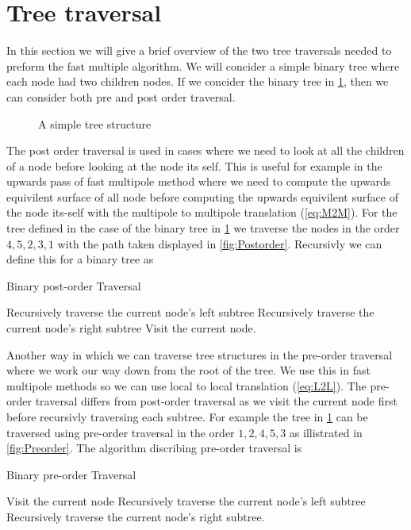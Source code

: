 \FloatBarrier
\section{Tree traversal}\label{appendix:Tree}
In this section we will give a brief overview of the two tree traversals needed to preform the fast multiple algorithm. We will concider a simple binary tree where each node had two children nodes. If we concider the binary tree in \cref{fig:BlankTree}, then we can consider both pre and post order traversal.
\begin{figure}[ht]
    \centering
    \resizebox{.4\linewidth}{!}{}
    \caption{A simple tree structure}
    \label{fig:BlankTree}
\end{figure}
The post order traversal is used in cases where we need to look at all the children of a node before looking at the node its self. This is useful for example in the upwards pass of fast multipole method where we need to compute the upwards equivilent surface of all node before computing the upwards equivilent surface of the node its-self with the multipole to multipole translation (\cref{eq:M2M}). For the tree defined in the case of the binary tree in \cref{fig:BlankTree} we traverse the nodes in the order $4, 5, 2, 3, 1$ with the path taken displayed in \cref{fig:Postorder}. Recursivly we can define this for a binary tree as
\begin{algorithm}
\caption{Binary post-order Traversal}
\begin{algorithmic}[1]
\State Recursively traverse the current node's left subtree
\State Recursively traverse the current node's right subtree
\State Visit the current node.
\end{algorithmic}
\end{algorithm}


Another way in which we can traverse tree structures in the pre-order traversal where we work our way down from the root of the tree. We use this in fast multipole methods so we can use local to local translation (\cref{eq:L2L}). The pre-order traversal differs from post-order traversal as we visit the current node first before recursivly traversing each subtree. For example the tree in \cref{fig:BlankTree} can be traversed using pre-order traversal in the order $1, 2, 4, 5, 3$ as illistrated in \cref{fig:Preorder}. The algorithm discribing pre-order traversal is
\begin{algorithm}
\caption{Binary pre-order Traversal}
\begin{algorithmic}[1]
\State Visit the current node
\State Recursively traverse the current node's left subtree
\State Recursively traverse the current node's right subtree.
\end{algorithmic}
\end{algorithm}

